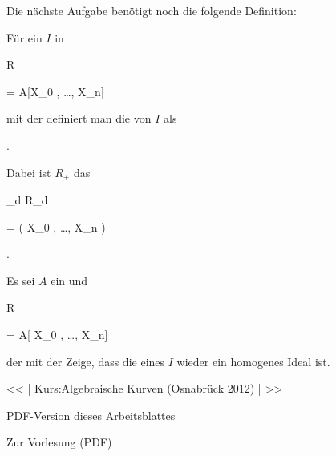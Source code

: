 {} {}


Die nächste Aufgabe benötigt noch die folgende Definition:


Für ein
$I$ in


\mavergleichskette

{\vergleichskette

{ R
}

{ = }{ A[X_0 , \ldots , X_n]
}

{  }{
}

{    }{
}

{   }{
}

}
{}{}{}
mit der
definiert man die 
 {} {}
von $I$ als


 { . }


Dabei ist $R_+$ das


\mavergleichskette

{\vergleichskette

{  \bigoplus_{d }R_d
}

{ = }{ \left(  X_0 , \ldots , X_n  \right)
}

{  }{
}

{    }{
}

{   }{
}

}
{}{}{.}



{}

{


Es sei $A$ ein
und


\mavergleichskette

{\vergleichskette

{ R
}

{ = }{ A[ X_0 , \ldots ,  X_n]
}

{  }{
}

{    }{
}

{   }{
}

}
{}{}{}
der
mit der
Zeige, dass die
eines
$I$ wieder ein homogenes Ideal ist.


}

{} {}


<< | Kurs:Algebraische Kurven (Osnabrück 2012) | >>


PDF-Version dieses Arbeitsblattes


 Zur Vorlesung
(PDF)

